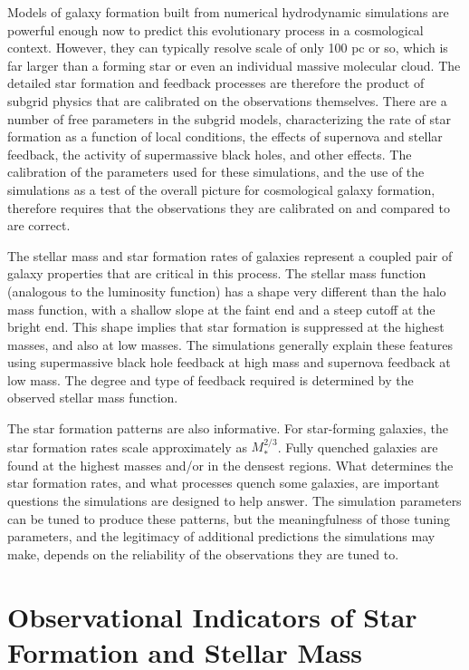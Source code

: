 Models of galaxy formation built from numerical hydrodynamic
simulations are powerful enough now to predict this evolutionary
process in a cosmological context. However, they can typically resolve
scale of only 100 pc or so, which is far larger than a forming star or
even an individual massive molecular cloud. The detailed star
formation and feedback processes are therefore the product of subgrid
physics that are calibrated on the observations themselves. There are
a number of free parameters in the subgrid models, characterizing the
rate of star formation as a function of local conditions, the effects
of supernova and stellar feedback, the activity of supermassive black
holes, and other effects.  The calibration of the parameters used for
these simulations, and the use of the simulations as a test of the
overall picture for cosmological galaxy formation, therefore requires
that the observations they are calibrated on and compared to are
correct.

The stellar mass and star formation rates of galaxies represent a
coupled pair of galaxy properties that are critical in this process.
The stellar mass function (analogous to the luminosity function) has a
shape very different than the halo mass function, with a shallow slope
at the faint end and a steep cutoff at the bright end. This shape
implies that star formation is suppressed at the highest masses, and
also at low masses. The simulations generally explain these features
using supermassive black hole feedback at high mass and supernova
feedback at low mass. The degree and type of feedback required is
determined by the observed stellar mass function. 

The star formation patterns are also informative. For star-forming
galaxies, the star formation rates scale approximately as
$M_\ast^{2/3}$. Fully quenched galaxies are found at the highest
masses and/or in the densest regions. What determines the star
formation rates, and what processes quench some galaxies, are
important questions the simulations are designed to help answer. The
simulation parameters can be tuned to produce these patterns, but the
meaningfulness of those tuning parameters, and the legitimacy of
additional predictions the simulations may make, depends on the
reliability of the observations they are tuned to.


\section{Observational Indicators of Star Formation and Stellar Mass}

